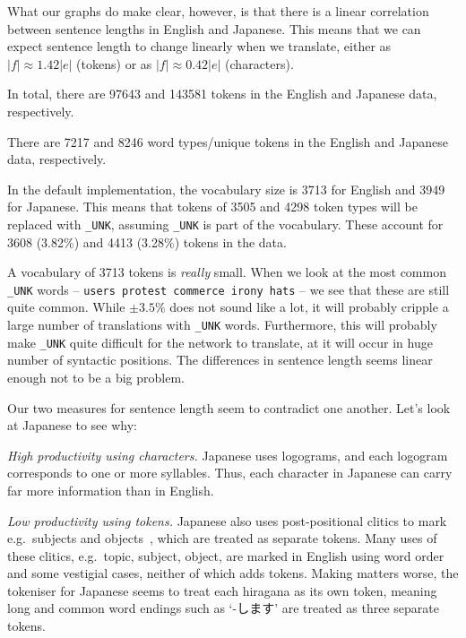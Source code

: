 \documentclass[answers]{exam}
\begin{document}
\begin{CJK}{UTF8}{min}
\begin{questions}
\begin{framed}
\begin{compactenum}[1.]
    What our graphs do make clear, however, is that there is a linear
    correlation between sentence lengths in English and Japanese. This means
    that we can expect sentence length to change linearly when we translate,
    either as $|f| \approx 1.42|e|$ (tokens) or as $|f| \approx 0.42|e|$
    (characters).
  \item
    In total, there are 97643 and 143581 tokens in the English and Japanese
    data, respectively.
  \item
    There are 7217 and 8246 word types/unique tokens in the English and Japanese
    data, respectively.
  \item
    In the default implementation, the vocabulary size is 3713 for English and
    3949 for Japanese. This means that tokens of 3505 and 4298 token types will
    be replaced with \texttt{\_UNK}, assuming \texttt{\_UNK} is part of the
    vocabulary. These account for 3608 (3.82\%) and 4413 (3.28\%) tokens in the
    data.
  \item
    A vocabulary of 3713 tokens is \emph{really} small. When we look at the most
    common \texttt{\_UNK} words -- \texttt{users protest commerce irony hats} --
    we see that these are still quite common. While $\pm 3.5\%$ does not sound
    like a lot, it will probably cripple a large number of translations with
    \texttt{\_UNK} words. Furthermore, this will probably make \texttt{\_UNK}
    quite difficult for the network to translate, at it will occur in huge
    number of syntactic positions.
    The differences in sentence length seems linear enough not to be a big
    problem.
  \end{compactenum}
\end{framed}


\begin{framed}
  Our two measures for sentence length seem to contradict one another. Let's
  look at Japanese to see why:
  \begin{compactitem}
  \item {\it High productivity using characters.}
    Japanese uses logograms, and each logogram corresponds to one or more
    syllables. Thus, each character in Japanese can carry far more information
    than in English.
  \item {\it Low productivity using tokens.}
    Japanese also uses post-positional clitics to mark e.g.\ subjects and
    objects~\citep{Hinds-1986}, which are treated as separate tokens.
    Many uses of these clitics, e.g.\ topic, subject, object, are marked in
    English using word order and some vestigial cases, neither of which adds
    tokens.
    Making matters worse, the tokeniser for Japanese seems to treat each
    hiragana as its own token, meaning long and common word endings such as
    `-します' are treated as three separate
    tokens.
  \end{compactitem}
\end{framed}



\end{questions}
\end{CJK}
\end{document}
